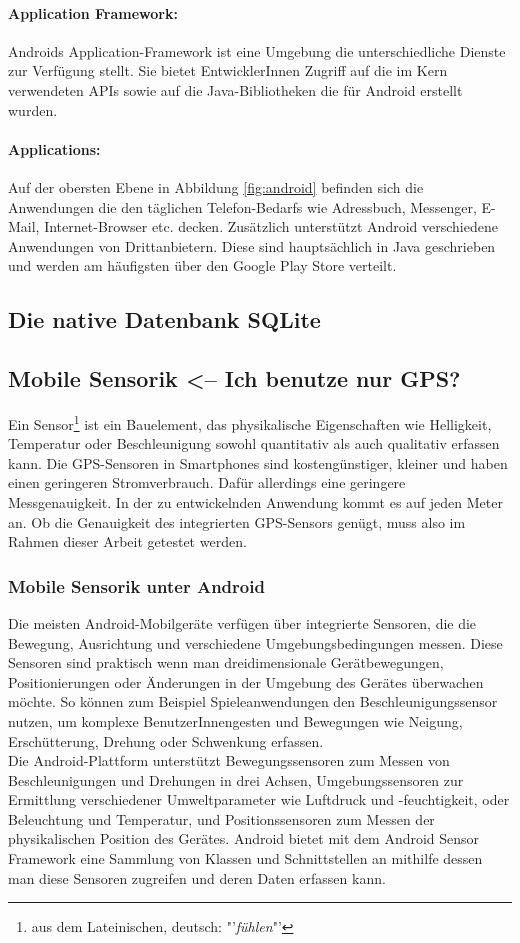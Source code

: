 \paragraph{Application Framework: }
Androids Application-Framework ist eine Umgebung die unterschiedliche Dienste zur Verfügung stellt. Sie bietet EntwicklerInnen Zugriff auf die im Kern verwendeten \glspl{API} sowie auf die Java-Bibliotheken die für Android erstellt wurden. 
\paragraph{Applications: }
Auf der obersten Ebene in Abbildung \ref{fig:android} befinden sich die Anwendungen die den täglichen Telefon-Bedarfs wie Adressbuch, Messenger, E-Mail, Internet-Browser etc. decken. Zusätzlich unterstützt Android verschiedene Anwendungen von Drittanbietern. Diese sind hauptsächlich in Java geschrieben und werden am häufigsten über den Google Play Store verteilt.
\subsection{Die native Datenbank SQLite}
\subsection{Mobile Sensorik <-- Ich benutze nur GPS?} 
Ein Sensor\footnote{ aus dem Lateinischen, deutsch: "'\textit{fühlen}"'} ist ein Bauelement, das physikalische Eigenschaften wie Helligkeit, Temperatur oder Beschleunigung sowohl quantitativ als auch qualitativ erfassen kann.
Die \gls{GPS}-Sensoren in \glspl{Smartphone} sind kostengünstiger, kleiner und haben einen geringeren Stromverbrauch. Dafür allerdings eine geringere Messgenauigkeit. In der zu entwickelnden Anwendung kommt es auf jeden Meter an. Ob die Genauigkeit des integrierten \gls{GPS}-Sensors genügt, muss also im Rahmen dieser Arbeit getestet werden. 
\subsubsection{Mobile Sensorik unter Android}
Die meisten Android-Mobilgeräte verfügen über integrierte Sensoren, die die Bewegung, Ausrichtung und verschiedene Umgebungsbedingungen messen. Diese Sensoren sind praktisch wenn man dreidimensionale Gerätbewegungen, Positionierungen oder Änderungen in der Umgebung des Gerätes überwachen möchte. So können zum Beispiel Spieleanwendungen den Beschleunigungssensor nutzen, um komplexe BenutzerInnengesten und Bewegungen wie Neigung, Erschütterung, Drehung oder Schwenkung erfassen.\\
Die Android-Plattform unterstützt Bewegungssensoren zum Messen von Beschleunigungen und Drehungen in drei Achsen, Umgebungssensoren zur Ermittlung verschiedener Umweltparameter wie Luftdruck und -feuchtigkeit, oder Beleuchtung und Temperatur, und Positionssensoren zum Messen der physikalischen Position des Gerätes. Android bietet mit dem Android Sensor Framework eine Sammlung von Klassen und Schnittstellen an mithilfe dessen man diese Sensoren zugreifen und deren Daten erfassen kann. \cite{android_sensor} 
